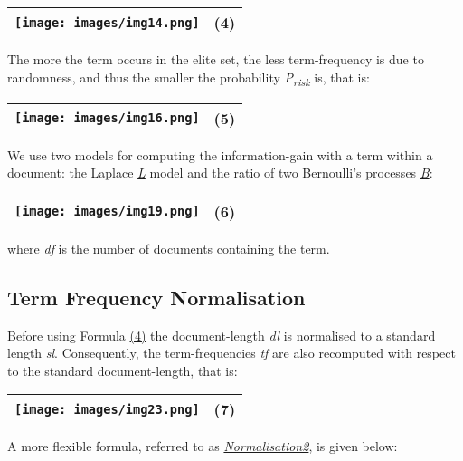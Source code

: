 \href{}{}

\begin{longtable}[]{@{}ll@{}}
\toprule
\texttt{[image: images/img14.png]} &
(4)\tabularnewline
\bottomrule
\end{longtable}

The more the term occurs in the elite set, the less term-frequency is
due to randomness, and thus the smaller the probability
\emph{P\textsubscript{risk}} is, that is:

\href{}{}

\begin{longtable}[]{@{}ll@{}}
\toprule
\texttt{[image: images/img16.png]} &
(5)\tabularnewline
\bottomrule
\end{longtable}

We use two models for computing the information-gain with a term within
a document: the Laplace
\emph{\href{javadoc/org/terrier/matching/models/aftereffect/L.html}{L}}
model and the ratio of two Bernoulli's processes
\emph{\href{javadoc/org/terrier/matching/models/aftereffect/B.html}{B}}:

\href{}{}

\begin{longtable}[]{@{}ll@{}}
\toprule
\texttt{[image: images/img19.png]} &
(6)\tabularnewline
\bottomrule
\end{longtable}

where \emph{df} is the number of documents containing the term.

\href{}{}

\subsection{Term Frequency
Normalisation}\label{term-frequency-normalisation}

Before using Formula \protect\hyperlink{Formula:DFR}{(4)} the
document-length \emph{dl} is normalised to a standard length \emph{sl}.
Consequently, the term-frequencies \emph{tf} are also recomputed with
respect to the standard document-length, that is:

\href{}{}

\begin{longtable}[]{@{}ll@{}}
\toprule
\texttt{[image: images/img23.png]} &
(7)\tabularnewline
\bottomrule
\end{longtable}

A more flexible formula, referred to as
\emph{\href{javadoc/org/terrier/matching/models/normalisation/Normalisation2.html}{Normalisation2}},
is given below:


